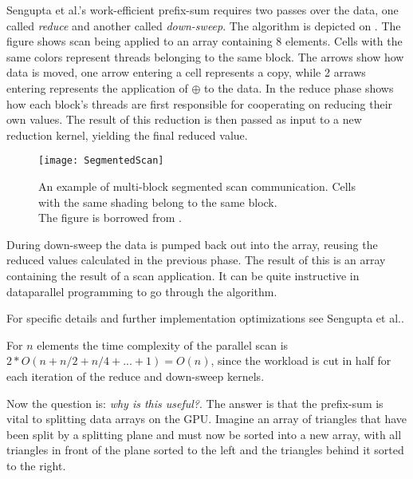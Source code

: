 
Sengupta et al.'s work-efficient prefix-sum
requires two passes over the data, one called \textit{reduce} and
another called \textit{down-sweep}. The algorithm is depicted on
. The figure shows scan being applied to an array
containing 8 elements. Cells with the same colors represent threads
belonging to the same block. The arrows show how data is moved, one
arrow entering a cell represents a copy, while 2 arraws entering
represents the application of $\oplus$ to the data. In the reduce
phase  shows how each block's threads are first
responsible for cooperating on reducing their own values. The result
of this reduction is then passed as input to a new reduction kernel,
yielding the final reduced value.

\begin{figure}
  \centering
  \texttt{[image: SegmentedScan]}
  \caption[Multi-block segmented scan communication.]{An example of
    multi-block segmented scan communication. Cells with the same
    shading belong to the same block. \\The figure is borrowed from
    .}
  \label{fig:segScan}
\end{figure}

During down-sweep the data is pumped back out into the array, reusing
the reduced values calculated in the previous phase. The result of
this is an array containing the result of a scan application. It can
be quite instructive in dataparallel programming to go through the
algorithm.

For specific details and further implementation optimizations see
Sengupta et al..



For $n$ elements the time complexity of the parallel scan is $2 * O(n
+ n/2 + n/4 + ... + 1) = O(n)$, since the workload is cut in half for
each iteration of the reduce and down-sweep kernels.



Now the question is: \textit{why is this useful?}. The answer is that
the prefix-sum is vital to splitting data arrays on the GPU. Imagine
an array of triangles that have been split by a splitting plane and
must now be sorted into a new array, with all triangles in front of
the plane sorted to the left and the triangles behind it sorted to the
right. 

